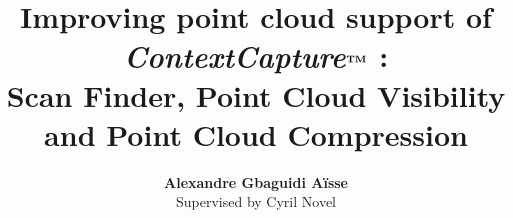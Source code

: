 \documentclass[a4paper,10pt,twoside]{report}
\newcommand{\CC }{\emph{ContextCapture$^{\text{\textbf{TM}}}$ }}
\begin{document}
\title{\LARGE {\bf Improving point cloud support of \CC:\\Scan Finder, Point Cloud Visibility and Point Cloud Compression}\\
 \vspace*{6mm}
}

\author{{\bf Alexandre Gbaguidi A\"isse}\\\vspace{3cm}Supervised by Cyril Novel}

\normallinespacing
\maketitle

\preface




\body









\appendix




\end{document}
